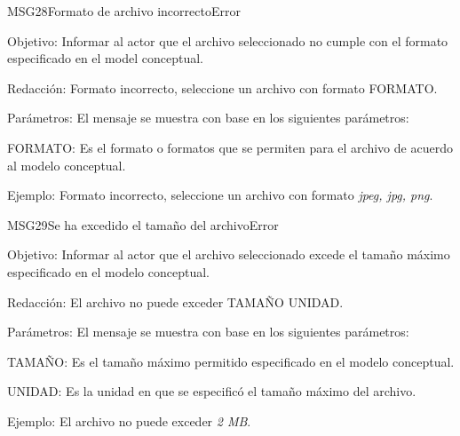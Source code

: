 \begin{mensaje}{MSG28}{Formato de archivo incorrecto}{Error}
    \item[Objetivo:] Informar al actor que el archivo seleccionado no cumple con el formato especificado en el model conceptual.
    \item[Redacción:] Formato incorrecto, seleccione un archivo con formato FORMATO.
    \item[Parámetros:] El mensaje se muestra con base en los siguientes parámetros:
    \begin{Citemize}
	\item FORMATO: Es el formato o formatos que se permiten para el archivo de acuerdo al modelo conceptual.
    \end{Citemize}
    \item[Ejemplo:] Formato incorrecto, seleccione un archivo con formato {\em jpeg, jpg, png}.
\end{mensaje}
\begin{mensaje}{MSG29}{Se ha excedido el tamaño del archivo}{Error}
    \item[Objetivo:] Informar al actor que el archivo seleccionado excede el tamaño máximo especificado en el modelo conceptual.
    \item[Redacción:] El archivo no puede exceder TAMAÑO UNIDAD.
    \item[Parámetros:] El mensaje se muestra con base en los siguientes parámetros:
    \begin{Citemize}
	\item TAMAÑO: Es el tamaño máximo permitido especificado en el modelo conceptual.
	\item UNIDAD: Es la unidad en que se especificó el tamaño máximo del archivo.
    \end{Citemize}
    \item[Ejemplo:] El archivo no puede exceder {\em 2 MB}.
\end{mensaje}